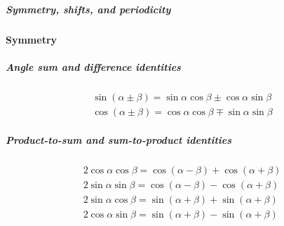 \documentclass{article}
\begin{document}
\subparagraph{Symmetry, shifts, and periodicity}
\textbf{Symmetry}

\subparagraph{Angle sum and difference identities}

\begin{align*}
  \sin(\alpha \pm \beta) = \sin\alpha \cos\beta \pm \cos\alpha \sin\beta\\
  \cos(\alpha \pm \beta) = \cos\alpha \cos\beta \mp \sin\alpha \sin\beta
\end{align*}


\subparagraph{Product-to-sum and sum-to-product identities}
\begin{align*}
   2 \cos \alpha \cos \beta = \cos(\alpha - \beta) + \cos(\alpha + \beta)\\
   2 \sin \alpha \sin \beta = \cos(\alpha - \beta) - \cos(\alpha + \beta)\\
   2 \sin \alpha \cos \beta = \sin(\alpha + \beta) + \sin(\alpha + \beta)\\
   2 \cos \alpha \sin \beta = \sin(\alpha + \beta) - \sin(\alpha + \beta)
\end{align*}



\end{document}

